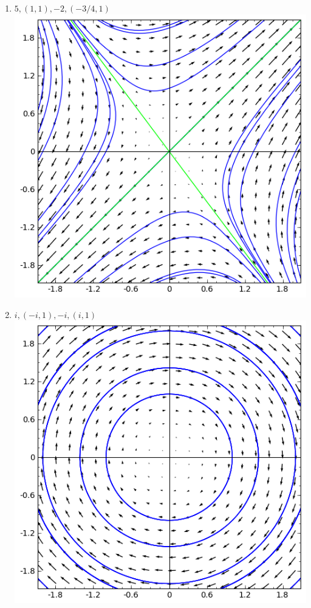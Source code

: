 {\begin{multicols}{2}
\begin{enumerate}
\begin{enumerate}
\item $5, (1,1),  -2, (-3/4,1)$\\\includegraphics[width=\myvfwidth]{Applications/support/vfe}
\item $i, (-i,1),  -i, (i,1)$\\\includegraphics[width=\myvfwidth]{Applications/support/vff}

\end{enumerate}
\end{enumerate}
\end{multicols}}
